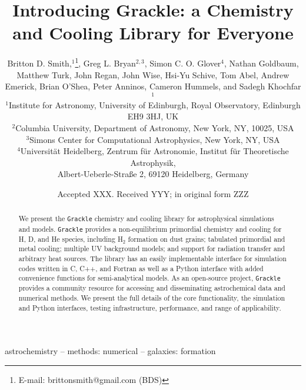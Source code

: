 \documentclass[a4paper,fleqn,usenatbib]{mnras}
\title[The Grackle]{Introducing Grackle: a Chemistry and Cooling
  Library for Everyone}
\author[B.D. Smith et al.]
       {Britton D. Smith,$^{1}$\thanks{E-mail: brittonsmith@gmail.com
           (BDS)},
        Greg L. Bryan$^{2,3}$,
        Simon C. O. Glover$^{4}$,
        Nathan Goldbaum, \newauthor
        Matthew Turk,
        John Regan,
        John Wise,
        Hsi-Yu Schive,
        Tom Abel, \newauthor
        Andrew Emerick,
        Brian O'Shea,
        Peter Anninos,
        Cameron Hummels, \newauthor
        and Sadegh Khochfar$^{1}$\\
$^{1}$Institute for Astronomy, University of Edinburgh, Royal
Observatory, Edinburgh EH9 3HJ, UK\\
$^{2}$Columbia University, Department of Astronomy, New York, NY,
10025, USA\\
$^{3}$Simons Center for Computational Astrophysics, New York, NY, USA\\
$^{4}$Universit\"{a}t Heidelberg, Zentrum f\"{u}r Astronomie, Institut f\"{u}r Theoretische Astrophysik, \\ Albert-Ueberle-Stra{\ss}e 2,
69120 Heidelberg, Germany
}
\date{Accepted XXX. Received YYY; in original form ZZZ}
\begin{document}
\label{firstpage}
\pagerange{\pageref{firstpage}--\pageref{lastpage}}
\maketitle

\begin{abstract}
We present the \texttt{Grackle} chemistry and cooling library for
astrophysical simulations and models.  \texttt{Grackle} provides
a non-equilibrium primordial chemistry and cooling for H, D, and He
species, including H$_{2}$ formation on dust grains; tabulated
primordial and metal cooling; multiple UV background models; and
support for radiation transfer and arbitrary heat sources.  The
library has an easily implementable interface for simulation codes
written in C, C++, and Fortran as well as a Python interface with
added convenience functions for semi-analytical models.  As an
open-source project, \texttt{Grackle} provides a community resource
for accessing and disseminating astrochemical data and numerical
methods.  We present the full details of the core functionality, the
simulation and Python interfaces, testing infrastructure, performance,
and range of applicability.
\end{abstract}

\begin{keywords}
astrochemistry -- methods: numerical -- galaxies: formation
\end{keywords}

















\footnotesize{
  
  
}

\bsp
\label{lastpage}
\end{document}
